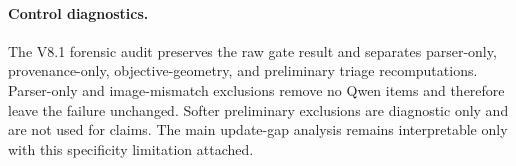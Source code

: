 
\paragraph{Control diagnostics.}
The V8.1 forensic audit preserves the raw gate result and separates parser-only, provenance-only, objective-geometry, and preliminary triage recomputations. Parser-only and image-mismatch exclusions remove no Qwen items and therefore leave the failure unchanged. Softer preliminary exclusions are diagnostic only and are not used for claims. The main update-gap analysis remains interpretable only with this specificity limitation attached.
